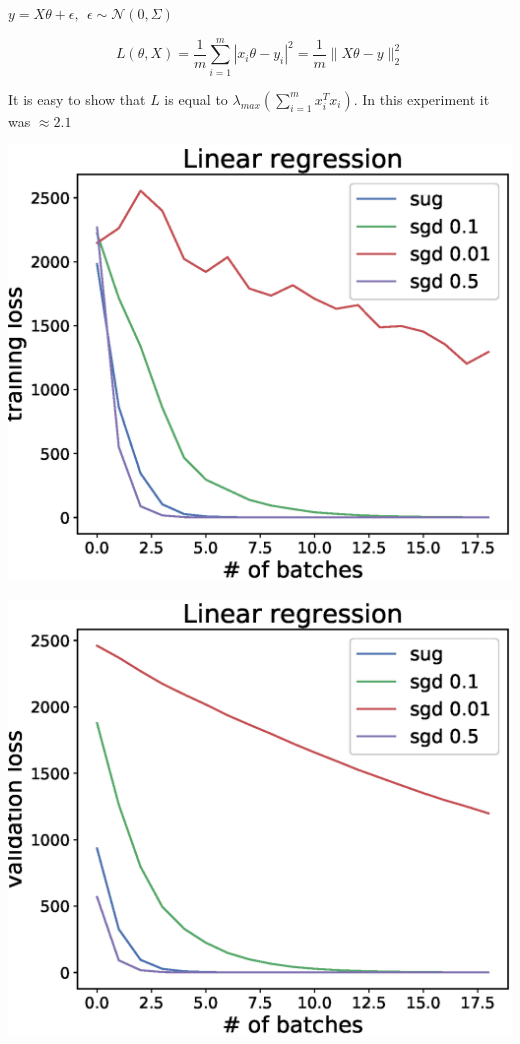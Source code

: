 \documentclass[a0]{a0poster}
\begin{document}
\begin{textblock}{7.0}
$y = X \theta +\epsilon,~~\epsilon \sim \mathcal N(0,\Sigma)$

$$L(\theta, X) = \dfrac{1}{m}\sum\limits_{i=1}^m | x_i\theta -  y_i|^2 = \dfrac{1}{m}\|X\theta- y\|_2^2$$

It is easy to show that $L$ is equal to $\lambda_{max}\left(\sum\limits_{i=1}^mx_i^T x_i\right)$. In this experiment it was $\approx 2.1$

\begin{minipage}{0.35\textwidth}
	\begin{center}
		\includegraphics[width=1\textwidth]{figures/linreg.eps}
	\end{center}
\end{minipage}
\begin{minipage}{0.35\textwidth}
	\begin{center}
		\includegraphics[width=1\textwidth]{figures/linreg_val.eps}

\end{center}
\end{minipage}
\end{textblock}
\end{document}
